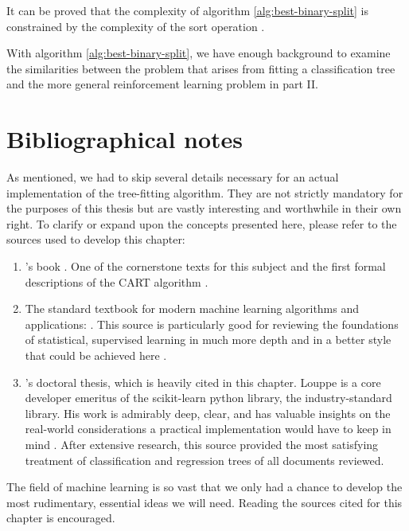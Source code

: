 It can be proved that the complexity of algorithm \ref{alg:best-binary-split} is
constrained by the complexity of the sort operation \cite[Ch.~5]{louppe2014}.

With algorithm \ref{alg:best-binary-split}, we have enough background to examine
the similarities between the problem that arises from fitting a classification
tree and the more general reinforcement learning problem in part II.

\section{Bibliographical notes}
As mentioned, we had to skip several details necessary for an actual
implementation of the tree-fitting algorithm. They are not strictly mandatory
for the purposes of this thesis but are vastly interesting and worthwhile in
their own right. To clarify or expand upon the concepts presented here, please
refer to the sources used to develop this chapter:
\begin{enumerate}
    \item \citeauthor{breiman2017}'s book . One of the
        cornerstone texts for this subject and the first formal descriptions of
        the CART algorithm \cite{breiman2017}.
    \item The standard textbook for modern machine learning algorithms and
        applications: . This source is particularly good
        for reviewing the foundations of statistical, supervised learning in
        much more depth and in a better style that could be achieved here
        \cite{elements2009}.
    \item \citeauthor{louppe2014}'s doctoral thesis, which is heavily cited in
        this chapter. Louppe is a core developer emeritus of the scikit-learn
        python library, the industry-standard library. His work is admirably
        deep, clear, and has valuable insights on the real-world considerations
        a practical implementation would have to keep in mind \cite{louppe2014}.
        After extensive research, this source provided the most satisfying
        treatment of classification and regression trees of all documents
        reviewed.
\end{enumerate}

The field of machine learning is so vast that we only had a chance to develop
the most rudimentary, essential ideas we will need. Reading the sources cited
for this chapter is encouraged.
